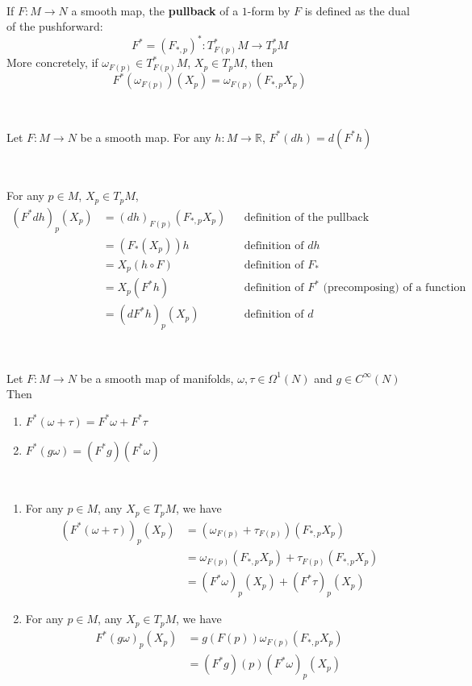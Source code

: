 \documentclass{article}
\begin{document}
\begin{definition}[Pullback]
  \

  If $F: M \to N$ a smooth map, the \textbf{pullback} of a $1$-form by $F$ is defined as the dual of the pushforward: $$F^* = (F_{*,p})^*: T^*_{F(p)}M \to T^*_pM$$More concretely, if $\omega_{F(p)} \in T_{F(p)}^*M$, $X_p \in T_pM$, then $$F^*(\omega_{F(p)})(X_p) = \omega_{F(p)}(F_{*,p}X_p)$$
\end{definition}

\begin{proposition}
  \

  Let $F: M \to N$ be a smooth map. For any $h: M \to \mathbb{R}$, $F^*(dh) = d(F^*h)$
\end{proposition}

\begin{customproof}
  \

  For any $p \in M$, $X_p \in T_pM$,
  \begin{align*}
    (F^*dh)_p(X_p) &= (dh)_{F(p)}(F_{*,p}X_p) && \text{definition of the pullback}\\
    &= (F_*(X_p))h && \text{definition of $dh$}\\
    &= X_p(h \circ F) && \text{definition of $F_*$}\\
    &= X_p(F^*h) && \text{definition of $F^*$ (precomposing) of a function}\\
    &= (dF^*h)_p(X_p) && \text{definition of $d$}
  \end{align*}
\end{customproof}

\begin{proposition}
  \

  Let $F: M \to N$ be a smooth map of manifolds, $\omega, \tau \in \Omega^1(N)$ and $g \in C^\infty(N)$ Then
  \begin{enumerate}
    \item $F^*(\omega + \tau) = F^*\omega + F^*\tau$
    \item $F^*(g\omega) = (F^*g)(F^*\omega)$
  \end{enumerate}
\end{proposition}

\begin{customproof}
  \

  \begin{enumerate}
    \item For any $p \in M$, any $X_p \in T_pM$, we have
      \begin{align*}
        (F^*(\omega+\tau))_p(X_p) &= (\omega_{F(p)} + \tau_{F(p)})(F_{*,p}X_p)\\
        &= \omega_{F(p)}(F_{*,p}X_p) + \tau_{F(p)}(F_{*,p}X_p)\\ &= (F^*\omega)_p(X_p) + (F^*\tau)_p(X_p)
      \end{align*}
    \item For any $p \in M$, any $X_p \in T_pM$, we have
      \begin{align*}
        F^*(g\omega)_p(X_p) &= g(F(p))\omega_{F(p)}(F_{*,p}X_p)\\ &= (F^*g)(p)(F^*\omega)_p(X_p)
      \end{align*}
  \end{enumerate}
\end{customproof}
\end{document}
